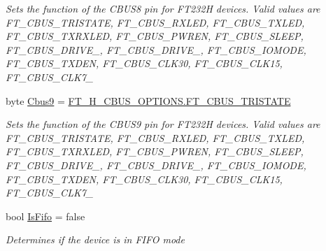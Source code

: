 \begin{DoxyCompactItemize}
\begin{DoxyCompactList}\small\item\em Sets the function of the C\+B\+U\+S8 pin for F\+T232H devices. Valid values are F\+T\+\_\+\+C\+B\+U\+S\+\_\+\+T\+R\+I\+S\+T\+A\+TE, F\+T\+\_\+\+C\+B\+U\+S\+\_\+\+R\+X\+L\+ED, F\+T\+\_\+\+C\+B\+U\+S\+\_\+\+T\+X\+L\+ED, F\+T\+\_\+\+C\+B\+U\+S\+\_\+\+T\+X\+R\+X\+L\+ED, F\+T\+\_\+\+C\+B\+U\+S\+\_\+\+P\+W\+R\+EN, F\+T\+\_\+\+C\+B\+U\+S\+\_\+\+S\+L\+E\+EP, F\+T\+\_\+\+C\+B\+U\+S\+\_\+\+D\+R\+I\+V\+E\+\_, F\+T\+\_\+\+C\+B\+U\+S\+\_\+\+D\+R\+I\+V\+E\+\_, F\+T\+\_\+\+C\+B\+U\+S\+\_\+\+I\+O\+M\+O\+DE, F\+T\+\_\+\+C\+B\+U\+S\+\_\+\+T\+X\+D\+EN, F\+T\+\_\+\+C\+B\+U\+S\+\_\+\+C\+L\+K30, F\+T\+\_\+\+C\+B\+U\+S\+\_\+\+C\+L\+K15, F\+T\+\_\+\+C\+B\+U\+S\+\_\+\+C\+L\+K7\+\_ \end{DoxyCompactList}\item 
byte \mbox{\hyperlink{class_f_t_d2_x_x___n_e_t_1_1_f_t_d_i_1_1_f_t232_h___e_e_p_r_o_m___s_t_r_u_c_t_u_r_e_a2f8d7dcd553eaa37d8e313d9eae01d17}{Cbus9}} = \mbox{\hyperlink{class_f_t_d2_x_x___n_e_t_1_1_f_t_d_i_1_1_f_t__232_h___c_b_u_s___o_p_t_i_o_n_s_a87f6bc339ec2e6bbb3ad093eb9d38278}{F\+T\+\_\+H\+\_\+\+C\+B\+U\+S\+\_\+\+O\+P\+T\+I\+O\+N\+S.\+F\+T\+\_\+\+C\+B\+U\+S\+\_\+\+T\+R\+I\+S\+T\+A\+TE}}
\begin{DoxyCompactList}\small\item\em Sets the function of the C\+B\+U\+S9 pin for F\+T232H devices. Valid values are F\+T\+\_\+\+C\+B\+U\+S\+\_\+\+T\+R\+I\+S\+T\+A\+TE, F\+T\+\_\+\+C\+B\+U\+S\+\_\+\+R\+X\+L\+ED, F\+T\+\_\+\+C\+B\+U\+S\+\_\+\+T\+X\+L\+ED, F\+T\+\_\+\+C\+B\+U\+S\+\_\+\+T\+X\+R\+X\+L\+ED, F\+T\+\_\+\+C\+B\+U\+S\+\_\+\+P\+W\+R\+EN, F\+T\+\_\+\+C\+B\+U\+S\+\_\+\+S\+L\+E\+EP, F\+T\+\_\+\+C\+B\+U\+S\+\_\+\+D\+R\+I\+V\+E\+\_, F\+T\+\_\+\+C\+B\+U\+S\+\_\+\+D\+R\+I\+V\+E\+\_, F\+T\+\_\+\+C\+B\+U\+S\+\_\+\+I\+O\+M\+O\+DE, F\+T\+\_\+\+C\+B\+U\+S\+\_\+\+T\+X\+D\+EN, F\+T\+\_\+\+C\+B\+U\+S\+\_\+\+C\+L\+K30, F\+T\+\_\+\+C\+B\+U\+S\+\_\+\+C\+L\+K15, F\+T\+\_\+\+C\+B\+U\+S\+\_\+\+C\+L\+K7\+\_ \end{DoxyCompactList}\item 
bool \mbox{\hyperlink{class_f_t_d2_x_x___n_e_t_1_1_f_t_d_i_1_1_f_t232_h___e_e_p_r_o_m___s_t_r_u_c_t_u_r_e_a1305b4a4447ee600a2335713be11f42e}{Is\+Fifo}} = false
\begin{DoxyCompactList}\small\item\em Determines if the device is in F\+I\+FO mode \end{DoxyCompactList}\item 

\end{DoxyCompactItemize}
